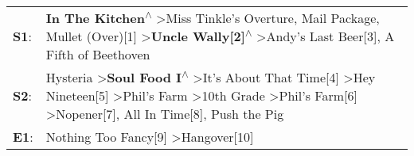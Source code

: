 \begin{supertabular}{p{0.03\textwidth}p{0.92\textwidth}}
 \textbf{S1}:  &                                                                                                                                   \textbf{In The Kitchen\textsuperscript{$\wedge$}} \textgreater \enspace Miss Tinkle's Overture\textsuperscript{}, \enspace Mail Package\textsuperscript{}, \enspace Mullet (Over)[1]\textsuperscript{} \textgreater \enspace \textbf{Uncle Wally[2]\textsuperscript{$\wedge$}} \textgreater \enspace Andy's Last Beer[3]\textsuperscript{}, \enspace A Fifth of Beethoven\textsuperscript{}  \enspace  \\
 \textbf{S2}:  &  Hysteria\textsuperscript{} \textgreater \enspace \textbf{Soul Food I\textsuperscript{$\wedge$}} \textgreater \enspace It's About That Time[4]\textsuperscript{} \textgreater \enspace Hey Nineteen[5]\textsuperscript{} \textgreater \enspace Phil's Farm\textsuperscript{} \textgreater \enspace 10th Grade\textsuperscript{} \textgreater \enspace Phil's Farm[6]\textsuperscript{} \textgreater \enspace Nopener[7]\textsuperscript{}, \enspace All In Time[8]\textsuperscript{}, \enspace Push the Pig\textsuperscript{}  \enspace  \\
 \textbf{E1}:  &                                                                                                                                                                                                                                                                                                                                                                                                                                   Nothing Too Fancy[9]\textsuperscript{} \textgreater \enspace Hangover[10]\textsuperscript{}  \enspace  \\
\end{supertabular}
